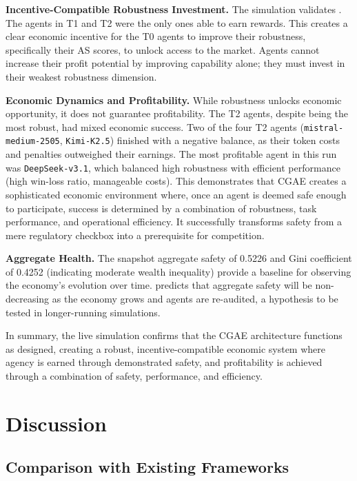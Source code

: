 \documentclass[11pt,a4paper]{article}
\begin{document}
\textbf{Incentive-Compatible Robustness Investment.} The simulation validates . The agents in T1 and T2 were the only ones able to earn rewards. This creates a clear economic incentive for the T0 agents to improve their robustness, specifically their AS scores, to unlock access to the market. Agents cannot increase their profit potential by improving capability alone; they must invest in their weakest robustness dimension.

\textbf{Economic Dynamics and Profitability.} While robustness unlocks economic opportunity, it does not guarantee profitability. The T2 agents, despite being the most robust, had mixed economic success. Two of the four T2 agents (\texttt{mistral-medium-2505}, \texttt{Kimi-K2.5}) finished with a negative balance, as their token costs and penalties outweighed their earnings. The most profitable agent in this run was \texttt{DeepSeek-v3.1}, which balanced high robustness with efficient performance (high win-loss ratio, manageable costs). This demonstrates that CGAE creates a sophisticated economic environment where, once an agent is deemed safe enough to participate, success is determined by a combination of robustness, task performance, and operational efficiency. It successfully transforms safety from a mere regulatory checkbox into a prerequisite for competition.

\textbf{Aggregate Health.} The snapshot aggregate safety of 0.5226 and Gini coefficient of 0.4252 (indicating moderate wealth inequality) provide a baseline for observing the economy's evolution over time.  predicts that aggregate safety will be non-decreasing as the economy grows and agents are re-audited, a hypothesis to be tested in longer-running simulations.

In summary, the live simulation confirms that the CGAE architecture functions as designed, creating a robust, incentive-compatible economic system where agency is earned through demonstrated safety, and profitability is achieved through a combination of safety, performance, and efficiency.


\section{Discussion}
\label{sec:discussion}

\subsection{Comparison with Existing Frameworks}
\end{document}
